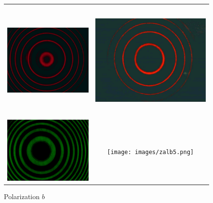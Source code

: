 \documentclass[a4paper,12pt,abstracton]{scrartcl}
\begin{document}
\begin{figure}[H]
    \centering
    \begin{tabular}{c c}
      \includegraphics[height=6cm,keepaspectratio]{images/znb5.png} & \includegraphics[height=6cm,keepaspectratio]{images/znlb8.png} \\
      \includegraphics[width=7.5cm,keepaspectratio]{images/zab4.png} & \texttt{[image: images/zalb5.png]} \\
      \end{tabular}
    \caption{Polarization $b$}
    \label{fig:pb}
\end{figure}
\end{document}
